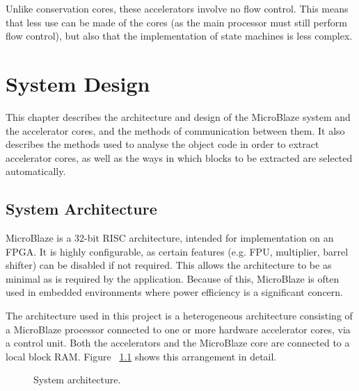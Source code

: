 \documentclass{UoYCSproject}
\begin{document}
Unlike conservation cores, these accelerators involve no flow control.
This means that less use can be made of the cores (as the main processor must still perform flow control),
but also that the implementation of state machines is less complex.

\chapter{System Design}

This chapter describes the architecture and design of the MicroBlaze system and the accelerator cores, and the
methods of communication between them. It also describes the methods used to analyse the object code in order to
extract accelerator cores, as well as the ways in which blocks to be extracted are selected automatically.

\section{System Architecture}

MicroBlaze \cite{microblaze} is a 32-bit RISC architecture, intended for implementation on an FPGA.
It is highly configurable, as certain features (e.g. FPU, multiplier, barrel shifter) can be disabled if not required.
This allows the architecture to be as minimal as is required by the application. Because of this, MicroBlaze is often used in
embedded environments where power efficiency is a significant concern.

The architecture used in this project is a heterogeneous architecture consisting of a MicroBlaze processor connected
to one or more hardware accelerator cores, via a control unit. Both the accelerators and the MicroBlaze core are connected
to a local block RAM. Figure ~\ref{fig:systemArchitecture} shows this arrangement in detail.

\begin{figure}[H]
\caption{System architecture.}
\label{fig:systemArchitecture}
\end{figure}
\end{document}
